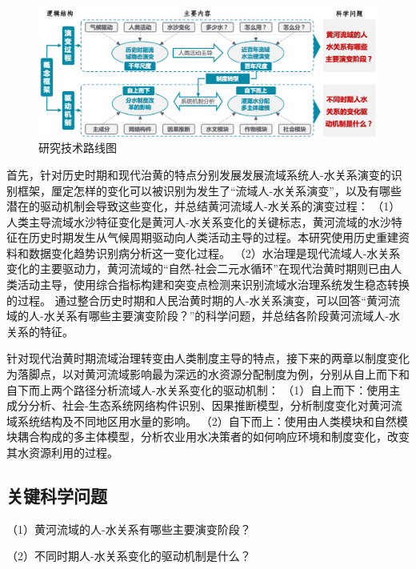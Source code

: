 \begin{figure}[htb] %
    \includegraphics[width=\textwidth]{img/ch1/ch1_workflow.png}
    \caption{研究技术路线图}\label{ch1:fig:workflow}
\end{figure}

首先，针对历史时期和现代治黄的特点分别发展发展流域系统人-水关系演变的识别框架，厘定怎样的变化可以被识别为发生了“流域人-水关系演变”，以及有哪些潜在的驱动机制会导致这些变化，并总结黄河流域人-水关系的演变过程：
（1）人类主导流域水沙特征变化是黄河人-水关系变化的关键标志，黄河流域的水沙特征在历史时期发生从气候周期驱动向人类活动主导的过程。本研究使用历史重建资料和数据变化趋势识别病分析这一变化过程。
（2）水治理是现代流域人-水关系变化的主要驱动力，黄河流域的“自然-社会二元水循环”在现代治黄时期则已由人类活动主导，使用综合指标构建和突变点检测来识别流域水治理系统发生稳态转换的过程。
通过整合历史时期和人民治黄时期的人-水关系演变，可以回答“黄河流域的人-水关系有哪些主要演变阶段？”的科学问题，并总结各阶段黄河流域人-水关系的特征。

针对现代治黄时期流域治理转变由人类制度主导的特点，接下来的两章以制度变化为落脚点，以对黄河流域影响最为深远的水资源分配制度为例，分别从自上而下和自下而上两个路径分析流域人-水关系变化的驱动机制：
（1）自上而下：使用主成分分析、社会-生态系统网络构件识别、因果推断模型，分析制度变化对黄河流域系统结构及不同地区用水量的影响。
（2）自下而上：使用由人类模块和自然模块耦合构成的多主体模型，分析农业用水决策者的如何响应环境和制度变化，改变其水资源利用的过程。

\subsection{关键科学问题}

（1）黄河流域的人-水关系有哪些主要演变阶段？

（2）不同时期人-水关系变化的驱动机制是什么？
